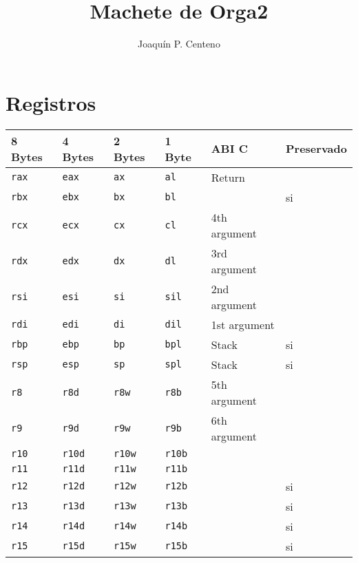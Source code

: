 \documentclass{article}
\begin{document}
\title{Machete de Orga2}
\author{Joaqu\'in P. Centeno}
\maketitle

\section{Registros}

\begin{tabular}{l l l l l l}
    \toprule
    \textbf{8 Bytes} & \textbf{4 Bytes} & \textbf{2 Bytes} & \textbf{1 Byte} & \textbf{ABI C} & \textbf{Preservado} \\
    \midrule
    \texttt{rax} & \texttt{eax}  & \texttt{ax}   & \texttt{al}   & Return       &    \\
    \texttt{rbx} & \texttt{ebx}  & \texttt{bx}   & \texttt{bl}   &              & si \\
    \texttt{rcx} & \texttt{ecx}  & \texttt{cx}   & \texttt{cl}   & 4th argument &    \\
    \texttt{rdx} & \texttt{edx}  & \texttt{dx}   & \texttt{dl}   & 3rd argument &    \\
    \texttt{rsi} & \texttt{esi}  & \texttt{si}   & \texttt{sil}  & 2nd argument &    \\
    \texttt{rdi} & \texttt{edi}  & \texttt{di}   & \texttt{dil}  & 1st argument &    \\
    \texttt{rbp} & \texttt{ebp}  & \texttt{bp}   & \texttt{bpl}  & Stack        & si \\
    \texttt{rsp} & \texttt{esp}  & \texttt{sp}   & \texttt{spl}  & Stack        & si \\
    \texttt{r8}  & \texttt{r8d}  & \texttt{r8w}  & \texttt{r8b}  & 5th argument &    \\
    \texttt{r9}  & \texttt{r9d}  & \texttt{r9w}  & \texttt{r9b}  & 6th argument &    \\
    \texttt{r10} & \texttt{r10d} & \texttt{r10w} & \texttt{r10b} &              &    \\
    \texttt{r11} & \texttt{r11d} & \texttt{r11w} & \texttt{r11b} &              &    \\
    \texttt{r12} & \texttt{r12d} & \texttt{r12w} & \texttt{r12b} &              & si \\
    \texttt{r13} & \texttt{r13d} & \texttt{r13w} & \texttt{r13b} &              & si \\
    \texttt{r14} & \texttt{r14d} & \texttt{r14w} & \texttt{r14b} &              & si \\
    \texttt{r15} & \texttt{r15d} & \texttt{r15w} & \texttt{r15b} &              & si \\
    \bottomrule
\end{tabular}
\end{document}
